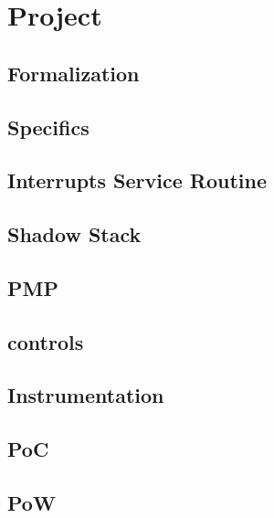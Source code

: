 \chapter{Project}
\label{cha:Project}

\lipsum[1]

\section{Formalization}
\label{cha:project_Formalization}

\lipsum[1]

\section{Specifics}
\label{cha:project_Specifics}

\lipsum[1]

\section{Interrupts Service Routine}
\label{cha:project_Interrupts-Service-Routine}

\lipsum[1]

\section{Shadow Stack}
\label{cha:project_Shadow-Stack}

\lipsum[1]

\section{PMP}
\label{cha:project_PMP}

\lipsum[1]

\section{controls}
\label{cha:project_controls}

\lipsum[1]

\section{Instrumentation}
\label{cha:project_Instrumentation}

\lipsum[1]

\section{PoC}
\label{cha:project_PoC}

\lipsum[1]

\section{PoW}
\label{cha:project_PoW}

\lipsum[1]